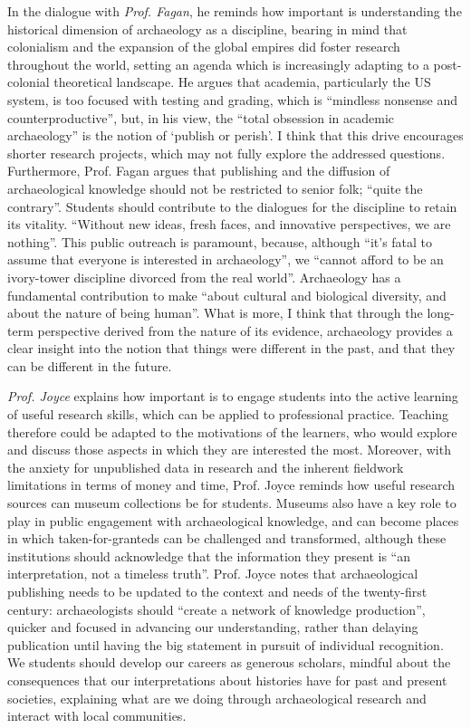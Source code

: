		 In the dialogue with \emph{Prof. Fagan}, he reminds how important is understanding the historical dimension of archaeology as a discipline, bearing in mind that colonialism and the expansion of the global empires did foster research throughout the world, setting an agenda which is increasingly adapting to a post-colonial theoretical landscape. He argues that academia, particularly the US system, is too focused with testing and grading, which is “mindless nonsense and counterproductive”, but, in his view, the “total obsession in academic archaeology” is the notion of ‘publish or perish’. I think that this drive encourages shorter research projects, which may not fully explore the addressed questions. Furthermore, Prof. Fagan argues that publishing and the diffusion of archaeological knowledge should not be restricted to senior folk; “quite the contrary”. Students should contribute to the dialogues for the discipline to retain its vitality. “Without new ideas, fresh faces, and innovative perspectives, we are nothing”. This public outreach is paramount, because, although “it’s fatal to assume that everyone is interested in archaeology”, we “cannot afford to be an ivory-tower discipline divorced from the real world”. Archaeology has a fundamental contribution to make “about cultural and biological diversity, and about the nature of being human”. What is more, I think that through the long-term perspective derived from the nature of its evidence, archaeology provides a clear insight into the notion that things were different in the past, and that they can be different in the future. 
		 
		 \emph{Prof. Joyce} explains how important is to engage students into the active learning of useful research skills, which can be applied to professional practice. Teaching therefore could be adapted to the motivations of the learners, who would explore and discuss those aspects in which they are interested the most. Moreover, with the anxiety for unpublished data in research and the inherent fieldwork limitations in terms of money and time, Prof. Joyce reminds how useful research sources can museum collections be for students. Museums also have a key role to play in public engagement with archaeological knowledge, and can become places in which taken-for-granteds can be challenged and transformed, although these institutions should acknowledge that the information they present is “an interpretation, not a timeless truth”. Prof. Joyce notes that archaeological publishing needs to be updated to the context and needs of the twenty-first century: archaeologists should “create a network of knowledge production”, quicker and focused in advancing our understanding, rather than delaying publication until having the big statement in pursuit of individual recognition. We students should develop our careers as generous scholars, mindful about the consequences that our interpretations about histories have for past and present societies, explaining what are we doing through archaeological research and interact with local communities.
		 
